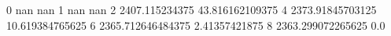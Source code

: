 0 nan nan
1 nan nan
2 2407.115234375 43.816162109375
4 2373.91845703125 10.619384765625
6 2365.712646484375 2.41357421875
8 2363.299072265625 0.0
